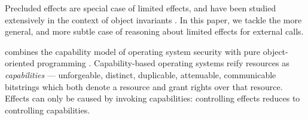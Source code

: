  
 
\noindent
Precluded effects are special case of limited effects,
and have been studied extensively in the context of object invariants   \cite{staticsfull,DrossoFrancaMuellerSummers08,BarDelFahLeiSch04,objInvars,MuellerPoetzsch-HeffterLeavens06}.
In this paper, we tackle the more general, %
and more subtle case of reasoning about limited effects for external calls.
 


 
 
combines the capability model
of operating system security \cite{levy:capabilities,CAP}
with pure object-oriented programming
\cite{selfpower,selfexp95,agha_actors_1987}.  Capability-based
operating systems reify resources
as \textit{capabilities} ---
unforgeable, distinct, duplicable, attenuable, communicable bitstrings
which both denote a resource and grant rights over that resource.
Effects can only be caused by invoking capabilities:
controlling effects reduces to controlling capabilities.


